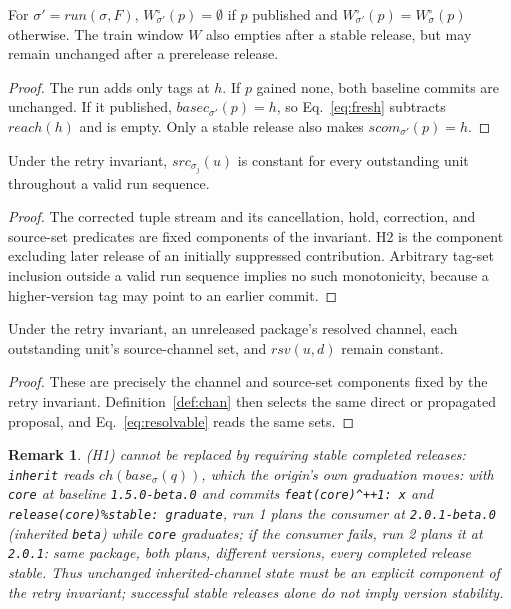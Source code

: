 \documentclass[sigconf,nonacm]{acmart}
\newcommand{\code}[1]{\texttt{#1}}
\newtheorem{remarknum}{Remark}
\begin{document}
\begin{lemma}
\label{lem:w}
For $\sigma' = \mathit{run}(\sigma,F)$, $W^\circ_{\sigma'}(p)=\emptyset$
if $p$ published and $W^\circ_{\sigma'}(p)=W^\circ_\sigma(p)$ otherwise.
The train window $W$ also empties after a stable release, but may remain
unchanged after a prerelease release.
\end{lemma}
\begin{proof}
The run adds only tags at $h$. If $p$ gained none, both baseline commits
are unchanged. If it published, $\mathit{basec}_{\sigma'}(p)=h$, so
Eq.~\ref{eq:fresh} subtracts $\mathit{reach}(h)$ and is empty. Only a
stable release also makes $\mathit{scom}_{\sigma'}(p)=h$.
\end{proof}

\begin{lemma}
\label{lem:s}
Under the retry invariant, $\mathit{src}_{\sigma_j}(u)$ is constant for
every outstanding unit throughout a valid run sequence.
\end{lemma}
\begin{proof}
The corrected tuple stream and its cancellation, hold, correction, and
source-set predicates are fixed components of the invariant. H2 is the
component excluding later release of an initially suppressed contribution.
Arbitrary tag-set inclusion outside a valid run sequence implies no such
monotonicity, because a higher-version tag may point to an earlier commit.
\end{proof}

\begin{lemma}
\label{lem:c}
Under the retry invariant, an unreleased package's resolved channel,
each outstanding unit's source-channel set, and
$\mathit{rsv}(u,d)$ remain constant.
\end{lemma}
\begin{proof}
These are precisely the channel and source-set components fixed by the
retry invariant. Definition~\ref{def:chan} then selects the same direct
or propagated proposal, and Eq.~\ref{eq:resolvable} reads the same sets.
\end{proof}

\begin{remarknum}
\label{rem:drift}
(H1) cannot be replaced by requiring stable completed releases: \code{inherit} reads
$\mathit{ch}(\mathit{base}_\sigma(q))$, which the origin's own
graduation moves: with \code{core} at baseline \code{1.5.0-beta.0} and
commits \code{feat(core)\^{}++1:~x} and
\code{release(core)\%stable:~graduate}, run 1 plans the consumer at
\code{2.0.1-beta.0} (inherited \code{beta}) while \code{core}
graduates; if the consumer fails, run 2 plans it at \code{2.0.1}:
same package, both plans, different versions, every completed release
stable. Thus unchanged inherited-channel state must be an explicit component of the
retry invariant; successful stable releases alone do not imply version stability.
\end{remarknum}
\end{document}
